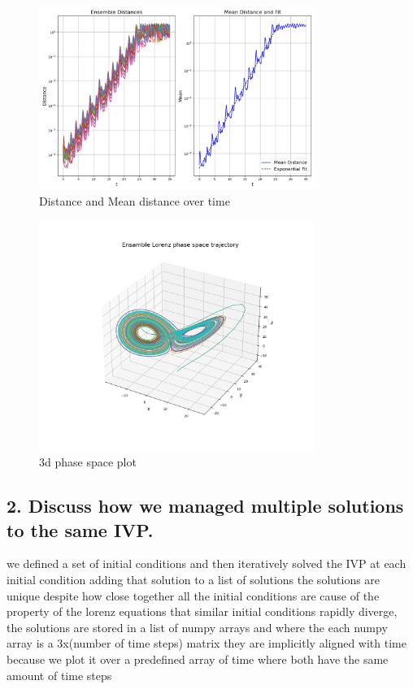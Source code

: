 \documentclass{article}
\begin{document}
    \begin{figure}[htbp]
        \centering
        \includegraphics[width=0.8\textwidth]{../distances.png}
        \caption{Distance and Mean distance over time}
        \label{fig: distances.png}
    \end{figure}

    \begin{figure}[htbp]
        \centering
        \includegraphics[width=0.8\textwidth]{../phaseSpace.png}
        \caption{3d phase space plot}
        \label{fig: phaseSpace.png}
    \end{figure}

    \FloatBarrier

\subsection*{2. Discuss how we managed multiple solutions to the same IVP.}
we defined a set of initial conditions and then iteratively solved the IVP at each initial condition adding that solution to a list of solutions
the solutions are unique despite how close together all the initial conditions are cause of the property of the lorenz equations that similar initial
conditions rapidly diverge, the solutions are stored in a list of numpy arrays and where the each numpy array is a 3x(number of time steps) matrix
they are implicitly aligned with time because we plot it over a predefined array of time where both have the same amount of time steps
\end{document}
